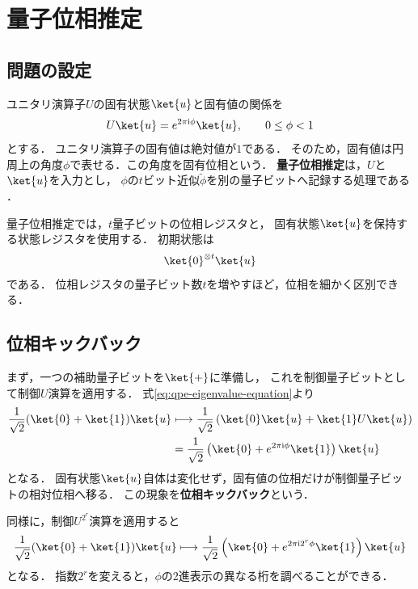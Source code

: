 \section{量子位相推定}
\label{sec:quantum-phase-estimation}

\subsection{問題の設定}
\label{subsec:qpe-problem-setting}

ユニタリ演算子$U$の固有状態$\ket{u}$と固有値の関係を
\begin{equation}
  U\ket{u}
  =
  e^{2\pi\mathrm{i}\phi}\ket{u},
  \qquad
  0\leq\phi<1
  \label{eq:qpe-eigenvalue-equation}
\end{equation}
とする．
ユニタリ演算子の固有値は絶対値が$1$である．
そのため，固有値は円周上の角度$\phi$で表せる．この角度を固有位相という．
\textbf{量子位相推定}は，$U$と$\ket{u}$を入力とし，
$\phi$の$t$ビット近似$\widetilde{\phi}$を別の量子ビットへ記録する処理である
\cite{shimada2020}．

量子位相推定では，$t$量子ビットの位相レジスタと，
固有状態$\ket{u}$を保持する状態レジスタを使用する．
初期状態は
\begin{align*}
  \ket{0}^{\otimes t}\ket{u}
\end{align*}
である．
位相レジスタの量子ビット数$t$を増やすほど，位相を細かく区別できる．

\subsection{位相キックバック}
\label{subsec:qpe-phase-kickback}

まず，一つの補助量子ビットを$\ket{+}$に準備し，
これを制御量子ビットとして制御$U$演算を適用する．
式\eqref{eq:qpe-eigenvalue-equation}より
\begin{align}
  \frac{1}{\sqrt{2}}
  (\ket{0}+\ket{1})\ket{u}
  &\longmapsto
  \frac{1}{\sqrt{2}}
  \left(
    \ket{0}\ket{u}
    +\ket{1}U\ket{u}
  \right)\notag\\
  &=
  \frac{1}{\sqrt{2}}
  \left(
    \ket{0}
    +e^{2\pi\mathrm{i}\phi}\ket{1}
  \right)\ket{u}
  \label{eq:single-qubit-phase-kickback}
\end{align}
となる．
固有状態$\ket{u}$自体は変化せず，固有値の位相だけが制御量子ビットの相対位相へ移る．
この現象を\textbf{位相キックバック}という．

同様に，制御$U^{2^r}$演算を適用すると
\begin{align*}
  \frac{1}{\sqrt{2}}(\ket{0}+\ket{1})\ket{u}
  \longmapsto
  \frac{1}{\sqrt{2}}
  \left(
    \ket{0}+e^{2\pi\mathrm{i}2^r\phi}\ket{1}
  \right)\ket{u}
\end{align*}
となる．
指数$2^r$を変えると，$\phi$の2進表示の異なる桁を調べることができる．

